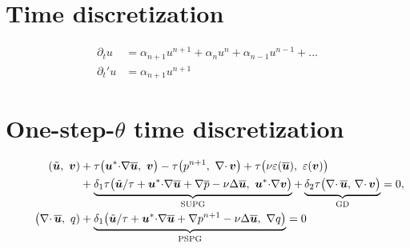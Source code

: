 \documentclass[review,onefignum,onetabnum]{siamart190516}
\begin{document}
\section{Time discretization}

\begin{align*}
\partial_t u &=  \alpha_{n+1} u^{n+1} + \alpha_{n} u^{n} + \alpha_{n-1} u^{n-1} + ... \\
\partial_t' u &=  \alpha_{n+1} u^{n+1} 
\end{align*}

%


\section{One-step-$\theta$ time discretization}

\begin{equation}
  \begin{aligned}
    \left( \tilde{{\boldsymbol u}} ,\  {\boldsymbol v} \right) 
    &+ \tau \big( {\boldsymbol u}^* {\cdot} \nabla \overline{{\boldsymbol u}},\ {\boldsymbol v} \big)
    - \tau \big( p^{n+1},\ \nabla{\cdot\,} {\boldsymbol v} \big) + 
    \tau \big( \nu \varepsilon(\overline{{\boldsymbol u}}),\ \varepsilon({\boldsymbol v}) \big) \\
    & 
    +  
    \underbrace{\delta_1 \tau \big(\tilde{{\boldsymbol u}}/\tau +  {\boldsymbol u}^* {\cdot} \nabla \overline{{\boldsymbol u}} + \nabla \overline{p} - \nu \Delta \overline{{\boldsymbol u}}, \
    {\boldsymbol u}^* {\cdot} \nabla {\boldsymbol v}\big)}_{\text{SUPG}}  +
    \underbrace{\delta_2 \tau \big(\nabla{\cdot\,} \overline{{\boldsymbol u}}, \, \nabla{\cdot\,} {\boldsymbol v} \big)}_{\text{GD}}
    =0, \\
    \hspace{2.2em} 
    \big( \nabla{\cdot\,} \overline{{\boldsymbol u}},\ q)&
    + \underbrace{\delta_1 \big( \tilde{{\boldsymbol u}}/\tau +  {\boldsymbol u}^* {\cdot} \nabla \overline{{\boldsymbol u}} + \nabla p^{n+1}  - \nu \Delta \overline{{\boldsymbol u}},\ \nabla q \big)}_{\text{PSPG}} = 0 
  \end{aligned}
\end{equation}
\end{document}
